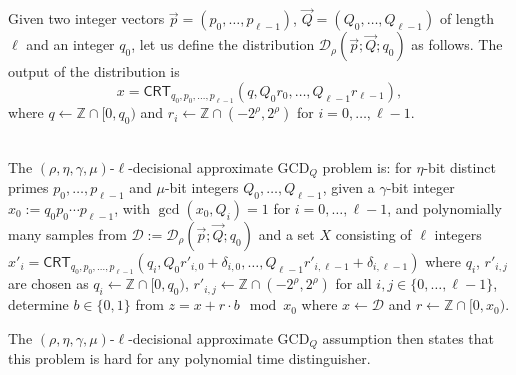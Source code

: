 \documentclass{llncs}
\newcommand{\Z}{{\mathbb Z}}
\newcommand*{\crt}{\ensuremath{\mathsf{CRT}}}
\newcommand*\D{\ensuremath{\mathcal D}}
\begin{document}
Given two integer vectors $\vec{p}=(p_0, \dots, p_{\ell-1})$, $\vec{Q}=(Q_0, \dots, Q_{\ell-1})$ of length $\ell$ and an integer $q_0$, let us define the distribution $\D_\rho(\vec{p}; \vec{Q}; q_0)$ as follows.  The output of the distribution is
\[
x=\crt_{q_0,p_0,\dots,p_{\ell-1}}(q,Q_0r_0,\dots,Q_{\ell-1}r_{\ell-1}),
\]
where $q\gets\Z\cap[0,q_0)$ and $r_i\gets\Z\cap(-2^\rho,2^\rho)$ for $i=0,\dots,\ell-1$.

\begin{definition} \\
The $(\rho,\eta,\gamma,\mu)$-$\ell$-decisional approximate GCD$_Q$ problem is: for $\eta$-bit distinct primes $p_0,\dots,p_{\ell-1}$ and $\mu$-bit integers $Q_0,\dots,Q_{\ell-1}$, given a $\gamma$-bit integer  $x_0:=q_0p_0\cdots p_{\ell-1}$, with $\gcd(x_0,Q_i)=1$ for $i=0,\dots,\ell-1$, and  %
polynomially many samples from $\D:=\D_{\rho}(\vec{p};\vec{Q};q_0)$ and a set $X$ consisting of $\ell$ integers $x'_i=\crt_{q_0,p_0,\dots,p_{\ell-1}}(q_i,Q_0r'_{i,0}+\delta_{i,0},\dots,Q_{\ell-1}r'_{i,\ell-1}+\delta_{i,\ell-1})$ where $q_i$, $r'_{i,j}$ are chosen as
$q_i\gets\Z\cap[0,q_0)$, $r'_{i,j}\gets\Z\cap(-2^\rho,2^\rho)$ for all $i,j\in\{0,\dots,\ell-1\}$, determine $b\in\{0,1\}$ from $z=x+r\cdot b\mod x_0$ where $x\gets\D$ and $r\gets\Z\cap[0,x_0)$.
\end{definition}

The $(\rho,\eta,\gamma,\mu)$-$\ell$-decisional approximate GCD$_Q$ assumption then states that this problem is hard for any polynomial time distinguisher.
\end{document}
